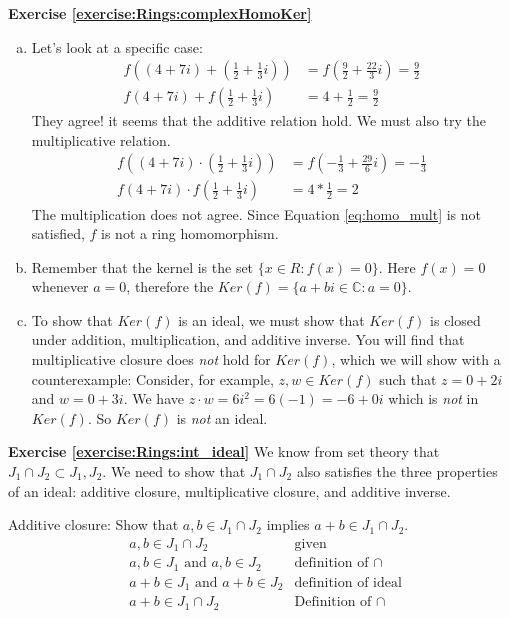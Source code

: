 \noindent\textbf{Exercise \ref{exercise:Rings:complexHomoKer}}
\begin{enumerate}[(a)]
\item Let's look at a specific case:
\begin{align*}
f((4+7i)+(\frac{1}{2}+\frac{1}{3}i))&=f(\frac{9}{2}+\frac{22}{3}i)=\frac{9}{2}\\
f(4+7i)+f(\frac{1}{2}+\frac{1}{3}i)&=4+\frac{1}{2}=\frac{9}{2}
\end{align*}
They agree! it seems that the additive relation hold. We must also try the multiplicative relation.
\begin{align*}
f((4+7i)\cdot(\frac{1}{2}+\frac{1}{3}i))&=f(-\frac{1}{3}+\frac{29}{6}i)=-\frac{1}{3}\\
f(4+7i)\cdot f(\frac{1}{2}+\frac{1}{3}i)&=4*\frac{1}{2}=2
\end{align*}
The multiplication does not agree. Since Equation \eqref{eq:homo_mult} is not satisfied, $f$ is not a ring homomorphism.
\item Remember that the kernel is the set $\{x\in R: f(x)=0\}$. Here $f(x)=0$ whenever $a=0$, therefore the $Ker(f)=\{a+bi\in{\mathbb C}: a=0\}$.
\item To show that $Ker(f)$ is an ideal, we must show that $Ker(f)$ is closed under addition, multiplication, and additive inverse.
You will find that multiplicative closure does \emph{not} hold for $Ker(f)$, which we will show with a counterexample:
Consider, for example, $z,w\in Ker(f)$ such that $z=0+2i$ and $w=0+3i$. We have $z\cdot w=6i^2=6(-1)=-6+0i$ which is \emph{not} in $Ker(f)$.  So $Ker(f)$ is \emph{not} an ideal.
\end{enumerate}


\noindent\textbf{Exercise \ref{exercise:Rings:int_ideal}}
We know from set theory that $J_1\cap J_2\subset J_1,J_2$.  We need to show that $J_1\cap J_2$ also satisfies the three properties of an ideal:  additive closure, multiplicative closure, and additive inverse.

Additive closure: Show that $a,b\in J_1\cap J_2$ implies $a+b\in J_1\cap J_2$.
\begin{align*}
&a,b\in J_1\cap J_2 & \text{given}\\
&a,b\in J_1\text{ and }a,b\in J_2& \text{definition of $\cap$}\\
&\text{$a+b\in J_1$ and $a+b\in J_2$} & \text{definition of ideal}\\
&a+b\in J_1\cap J_2 & \text{Definition of $\cap$}
\end{align*}

